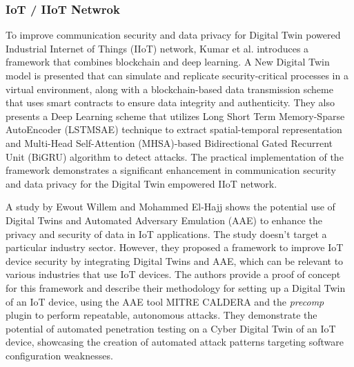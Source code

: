 
\subsubsection*{IoT / IIoT Netwrok}
To improve communication security and data privacy for Digital Twin powered Industrial Internet of Things (IIoT) network, Kumar et al.\cite{kumarBlockchainDeepLearning2022} introduces a framework that combines blockchain and deep learning. A New Digital Twin model is presented that  can simulate and replicate security-critical processes in a virtual environment, along with a blockchain-based data transmission scheme that uses smart contracts to ensure data integrity and authenticity. They also presents a Deep Learning scheme that utilizes Long Short Term Memory-Sparse AutoEncoder (LSTMSAE) technique to extract spatial-temporal representation and Multi-Head Self-Attention (MHSA)-based Bidirectional Gated Recurrent Unit (BiGRU) algorithm to detect attacks. The practical implementation of the framework demonstrates a significant enhancement in communication security and data privacy for the Digital Twin empowered IIoT network.

A study by Ewout Willem and Mohammed El-Hajj \cite{vanderwalSecuringNetworksIoT2022a} shows the potential use of Digital Twins and Automated Adversary Emulation (AAE) to enhance the privacy and security of data in IoT applications. The study doesn't target a particular industry sector. However, they proposed a framework to improve IoT device security by integrating Digital Twins and AAE, which  can be relevant to various industries that use IoT devices. The authors provide a proof of concept for this framework and describe their methodology for setting up a Digital Twin of an IoT device, using the AAE tool MITRE CALDERA and the \textit{precomp} plugin to perform repeatable, autonomous attacks. They demonstrate the potential of automated penetration testing on a Cyber Digital Twin of an IoT device, showcasing the creation of automated attack patterns targeting software configuration weaknesses.


